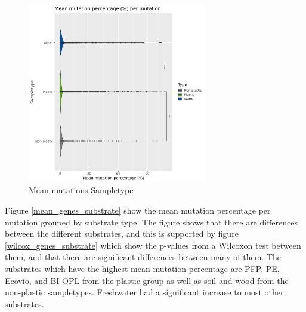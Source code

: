\begin{figure}[h]
    \centering
    \includegraphics[width = 0.7\textwidth]{figure/mean_genes_sampletype.png}
    \caption{Mean mutations Sampletype}
    \label{mean_genes_sampletype}
\end{figure}

Figure \ref{mean_genes_substrate} show the mean mutation percentage per mutation grouped by substrate type. The figure shows that there are differences between the different substrates, and this is supported by figure \ref{wilcox_genes_substrate} which show the p-values from a Wilcoxon test between them, and that there are significant differences between many of them.
The substrates which have the highest mean mutation percentage are PFP, PE, Ecovio, and BI-OPL from the plastic group as well as soil and wood from the non-plastic sampletypes. Freshwater had a significant increase to most other substrates.

